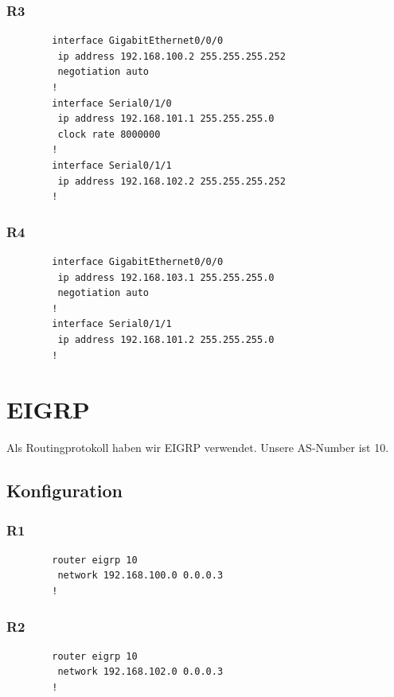 \documentclass[a4paper, ngerman]{article}
\begin{document}
\subsubsection{R3}
\begin{framed}
    \begin{verbatim}
        interface GigabitEthernet0/0/0
         ip address 192.168.100.2 255.255.255.252
         negotiation auto
        !
        interface Serial0/1/0
         ip address 192.168.101.1 255.255.255.0
         clock rate 8000000
        !
        interface Serial0/1/1
         ip address 192.168.102.2 255.255.255.252
        !
    \end{verbatim}
\end{framed}

\subsubsection{R4}
\begin{framed}
    \begin{verbatim}
        interface GigabitEthernet0/0/0
         ip address 192.168.103.1 255.255.255.0
         negotiation auto
        !
        interface Serial0/1/1
         ip address 192.168.101.2 255.255.255.0
        !
    \end{verbatim}
\end{framed}

\section{EIGRP}
Als Routingprotokoll haben wir EIGRP verwendet. Unsere AS-Number ist 10.
\subsection{Konfiguration}
\subsubsection{R1}
\begin{framed}
    \begin{verbatim}
        router eigrp 10
         network 192.168.100.0 0.0.0.3
        !
    \end{verbatim}
\end{framed}
\subsubsection{R2}
\begin{framed}
    \begin{verbatim}
        router eigrp 10
         network 192.168.102.0 0.0.0.3
        !
    \end{verbatim}
\end{framed}
\end{document}
